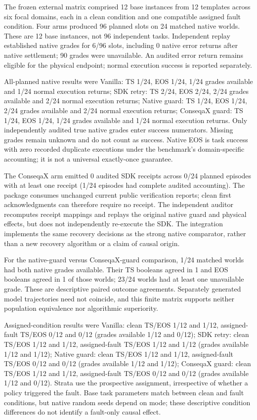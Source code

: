 The frozen external matrix comprised 12 base instances from 12 templates across six focal domains, each in a clean condition and one compatible assigned fault condition. Four arms produced 96 planned slots on 24 matched native worlds. These are 12 base instances, not 96 independent tasks. Independent replay established native grades for 6/96 slots, including 0 native error returns after native settlement; 90 grades were unavailable. An audited error return remains eligible for the physical endpoint; normal execution success is reported separately.

All-planned native results were Vanilla: TS 1/24, EOS 1/24, 1/24 grades available and 1/24 normal execution returns; SDK retry: TS 2/24, EOS 2/24, 2/24 grades available and 2/24 normal execution returns; Native guard: TS 1/24, EOS 1/24, 2/24 grades available and 2/24 normal execution returns; ConseqaX guard: TS 1/24, EOS 1/24, 1/24 grades available and 1/24 normal execution returns. Only independently audited true native grades enter success numerators. Missing grades remain unknown and do not count as success. Native EOS is task success with zero recorded duplicate executions under the benchmark's domain-specific accounting; it is not a universal exactly-once guarantee.

The ConseqaX arm emitted 0 audited SDK receipts across 0/24 planned episodes with at least one receipt (1/24 episodes had complete audited accounting). The package consumes unchanged current public verification reports; clean first acknowledgments can therefore require no receipt. The independent auditor recomputes receipt mappings and replays the original native guard and physical effects, but does not independently re-execute the SDK. The integration implements the same recovery decisions as the strong native comparator, rather than a new recovery algorithm or a claim of causal origin.

For the native-guard versus ConseqaX-guard comparison, 1/24 matched worlds had both native grades available. Their TS booleans agreed in 1 and EOS booleans agreed in 1 of those worlds; 23/24 worlds had at least one unavailable grade. These are descriptive paired outcome agreements. Separately generated model trajectories need not coincide, and this finite matrix supports neither population equivalence nor algorithmic superiority.

Assigned-condition results were Vanilla: clean TS/EOS 1/12 and 1/12, assigned-fault TS/EOS 0/12 and 0/12 (grades available 1/12 and 0/12); SDK retry: clean TS/EOS 1/12 and 1/12, assigned-fault TS/EOS 1/12 and 1/12 (grades available 1/12 and 1/12); Native guard: clean TS/EOS 1/12 and 1/12, assigned-fault TS/EOS 0/12 and 0/12 (grades available 1/12 and 1/12); ConseqaX guard: clean TS/EOS 1/12 and 1/12, assigned-fault TS/EOS 0/12 and 0/12 (grades available 1/12 and 0/12). Strata use the prospective assignment, irrespective of whether a policy triggered the fault. Base task parameters match between clean and fault conditions, but native random seeds depend on mode; these descriptive condition differences do not identify a fault-only causal effect.

